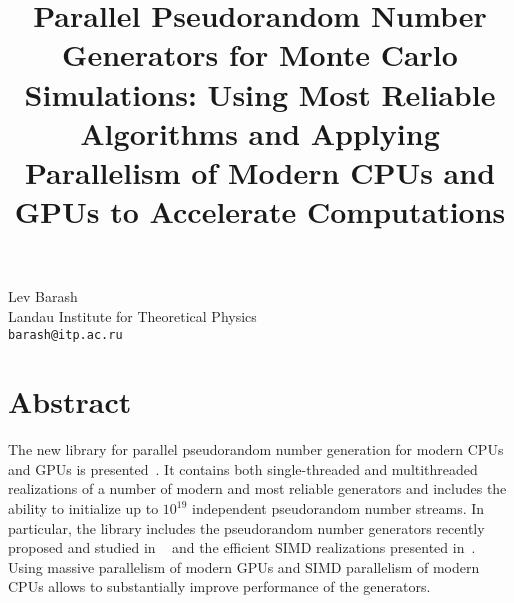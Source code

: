 \title{Parallel Pseudorandom Number Generators for Monte Carlo Simulations: Using Most Reliable Algorithms and Applying Parallelism of Modern CPUs and GPUs  to Accelerate Computations}
 \author{} \institute{}
\maketitle
\begin{center}
{\large Lev Barash}\\
Landau Institute for Theoretical Physics\\
{\tt barash@itp.ac.ru}

\end{center}

\section*{Abstract}

The new library for parallel pseudorandom number generation for modern CPUs and GPUs is presented~\cite{barash1}. It contains both single-threaded and multithreaded realizations of a number of modern and most reliable generators and includes the ability to initialize up to $10^{19}$ independent pseudorandom number streams. In particular, the library includes the pseudorandom number generators recently proposed and studied in ~\cite{barash2,barash3,barash4,barash5,barash6} and the efficient SIMD realizations presented in~\cite{barash7}. Using massive parallelism of modern GPUs and SIMD parallelism of modern CPUs allows to substantially improve performance of the generators.


